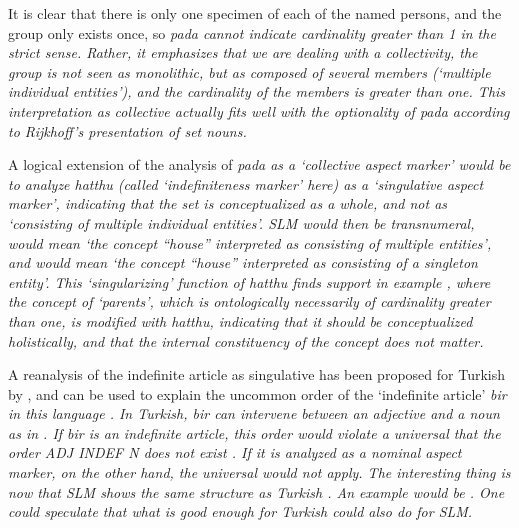 It is clear that there is only one specimen of each of the named persons, and the group only exists once, so \em pada \em cannot indicate cardinality greater than 1 in the strict sense. Rather, it emphasizes that we are dealing with a collectivity, the group is not seen as monolithic, but as composed of several members (`multiple individual entities'), and the cardinality of the members is greater than one. This interpretation as collective actually fits well with the optionality of \em pada \em according to Rijkhoff's presentation of \em set nouns\em.

A logical extension of the analysis of \em pada \em as a `collective aspect marker' would be to analyze  \em hatthu \em (called `indefiniteness marker' here) as a `singulative aspect marker', indicating that the set is conceptualized as a whole, and not as `consisting of multiple individual entities'. SLM  would then be transnumeral,  would mean `the concept ``house'' interpreted as consisting of multiple entities', and  would mean `the concept ``house'' interpreted as consisting of a singleton entity'. This `singularizing' function of \em hatthu \em finds support in example , where the concept of `parents', which is ontologically necessarily of cardinality greater than one, is modified with \em hatthu\em, indicating that it should be conceptualized holistically, and that the internal constituency of the concept does not matter.



A reanalysis of the indefinite article as singulative has been proposed for Turkish by \citet{Schroeder1999}, and can be used to explain the uncommon order of the `indefinite article' \em bir \em in this language \citep[319]{Rijkhoff2002}. In Turkish, \em bir \em can intervene between an adjective and a noun as in . If \em bir \em is an indefinite article, this order  would violate a universal  that the order ADJ INDEF N does not exist \citep{Greenberg1963,Hawkins1994}. If it is analyzed as a nominal aspect marker, on the other hand, the universal would not apply. The interesting thing is now that SLM shows the same structure as Turkish . An example would be . One could speculate that what is good enough for Turkish could also do for SLM.


